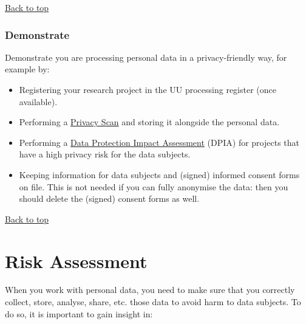 \documentclass[
]{book}
\providecommand{\tightlist}{%
  \setlength{\itemsep}{0pt}\setlength{\parskip}{0pt}}
\begin{document}
\protect\hyperlink{data-oriented-strategies}{Back to top}

\hypertarget{demonstrate}{%
\subsection{\texorpdfstring{ Demonstrate}{ Demonstrate}}\label{demonstrate}}

Demonstrate you are processing personal data in a privacy-friendly way, for
example by:

\begin{itemize}
\tightlist
\item
  Registering your research project in the UU processing register (once available).
\item
  Performing a \protect\hyperlink{privacy-scan}{Privacy Scan} and storing it alongside the personal data.
\item
  Performing a \protect\hyperlink{dpia}{Data Protection Impact Assessment} (DPIA) for
  projects that have a high privacy risk for the data subjects.
\item
  Keeping information for data subjects and (signed) informed consent forms on
  file. This is not needed if you can fully anonymise the data: then you should
  delete the (signed) consent forms as well.
\end{itemize}

\protect\hyperlink{data-oriented-strategies}{Back to top}

\hypertarget{risk-assessment}{%
\chapter{Risk Assessment}\label{risk-assessment}}

When you work with personal data, you need to make sure that you correctly
collect, store, analyse, share, etc. those data to avoid harm to data subjects.
To do so, it is important to gain insight in:
\end{document}
